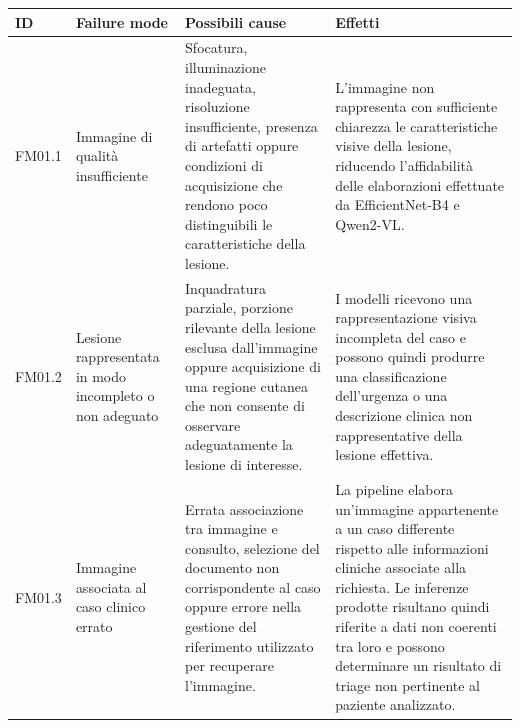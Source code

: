 \begin{table}[H]
    \centering
    \footnotesize
    \setlength{\tabcolsep}{3pt}
    \renewcommand{\arraystretch}{1.1}

    \begin{tabularx}{\textwidth}{
        >{\raggedright\arraybackslash}p{1.1cm}
        >{\raggedright\arraybackslash}p{3cm}
        >{\raggedright\arraybackslash}p{5cm}
        X
    }
        \toprule

        \textbf{ID} &
        \textbf{Failure mode} &
        \textbf{Possibili cause} &
        \textbf{Effetti} \\

        \midrule

        FM01.1 &
        Immagine di qualità insufficiente &
        Sfocatura, illuminazione inadeguata, risoluzione insufficiente,
        presenza di artefatti oppure condizioni di acquisizione che
        rendono poco distinguibili le caratteristiche della lesione. &
        L'immagine non rappresenta con sufficiente chiarezza le
        caratteristiche visive della lesione, riducendo l'affidabilità
        delle elaborazioni effettuate da EfficientNet-B4 e Qwen2-VL. \\

        \midrule

        FM01.2 &
        Lesione rappresentata in modo incompleto o non adeguato &
        Inquadratura parziale, porzione rilevante della lesione esclusa
        dall'immagine oppure acquisizione di una regione cutanea che non
        consente di osservare adeguatamente la lesione di interesse. &
        I modelli ricevono una rappresentazione visiva incompleta del caso
        e possono quindi produrre una classificazione dell'urgenza o una
        descrizione clinica non rappresentative della lesione effettiva. \\

        \midrule

        FM01.3 &
        Immagine associata al caso clinico errato &
        Errata associazione tra immagine e consulto, selezione del
        documento non corrispondente al caso oppure errore nella gestione
        del riferimento utilizzato per recuperare l'immagine. &
        La pipeline elabora un'immagine appartenente a un caso differente
        rispetto alle informazioni cliniche associate alla richiesta.
        Le inferenze prodotte risultano quindi riferite a dati non
        coerenti tra loro e possono determinare un risultato di triage
        non pertinente al paziente analizzato. \\


\end{tabularx}
\end{table}
